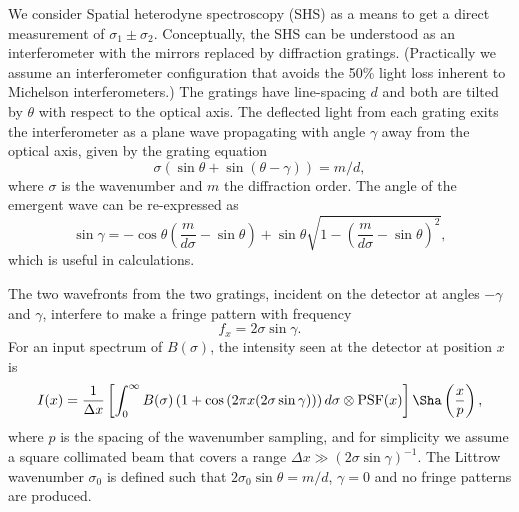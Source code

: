 \documentclass[preprint]{aastex}
\begin{document}
We consider Spatial heterodyne spectroscopy (SHS) \citep{1990SPIE.1235..622H}
as a means to get a direct measurement of  $\sigma_1\pm\sigma_2$.
Conceptually, the SHS can be understood as an interferometer with the  mirrors replaced by diffraction gratings.
(Practically we assume an interferometer configuration that  avoids the 50\% light loss inherent to  Michelson interferometers.)
The gratings have line-spacing $d$ and both are tilted
by $\theta$ with respect to the optical axis.  The deflected light from each grating exits the interferometer as a plane wave
propagating with angle $\gamma$ away from the optical axis,  given by the grating equation
\begin{equation}
\sigma\left(\sin{\theta}+\sin{\left(\theta-\gamma\right)}\right)=m/d,
\end{equation}
where $\sigma$ is the wavenumber and $m$ the diffraction order.
The angle of the emergent wave can be re-expressed as
\begin{equation}
\sin{\gamma}=-\cos{\theta} \left(\frac{m}{d\sigma} - \sin{\theta} \right)+ \sin{\theta}\sqrt{1-\left(\frac{m}{d\sigma} -\sin{\theta} \right)^2},
\end{equation}
which is useful in calculations.

The two wavefronts from the two gratings, incident on the detector at angles $-\gamma$ and $\gamma$, interfere to make a fringe
pattern with  frequency
\begin{equation}
f_x=2\sigma\sin{\gamma}.
\end{equation}
For an input spectrum of $B(\sigma)$, the intensity seen at the detector at position $x$ is
\begin{equation}
I(x)=\frac{1}{\Delta x}\left[\int_{0}^{\infty} B(\sigma)\left(1+\cos{\left(2 \pi x (2\sigma \sin{\gamma})\right)}\right)d\sigma \otimes \mbox{PSF}(x)\right]\Sha\left(\frac{x}{p}\right),
\end{equation}
where  $p$ is the spacing of the wavenumber sampling, and for simplicity we assume a square collimated beam that covers
a range  $\Delta x \gg \left(2\sigma \sin{\gamma}\right)^{-1}$.
The Littrow wavenumber $\sigma_0$ is defined such that $2\sigma_0\sin{\theta}=m/d$, $\gamma=0$ and no fringe patterns are produced.
\end{document}
